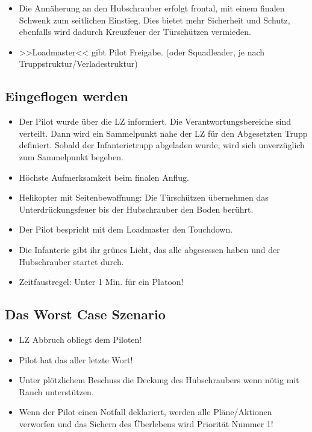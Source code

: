 \begin{itemize}
		\item Die Annäherung an den Hubschrauber erfolgt frontal, mit einem finalen Schwenk zum seitlichen Einstieg. Dies bietet mehr Sicherheit und Schutz, ebenfalls wird dadurch Kreuzfeuer der Türschützen vermieden.

		\item >>Loadmaster<< gibt Pilot Freigabe. (oder Squadleader, je nach Truppstruktur/Verladestruktur)
	\end{itemize}

\subsection{Eingeflogen werden}
	\begin{itemize} 
		\item Der Pilot wurde über die \ac{LZ} informiert. Die Verantwortungsbereiche sind verteilt. Dann wird ein Sammelpunkt nahe der \ac{LZ} für den Abgesetzten Trupp definiert. Sobald der Infanterietrupp abgeladen wurde, wird sich unverzüglich zum Sammelpunkt begeben.

		\item Höchste Aufmerksamkeit beim finalen Anflug.

		\item Helikopter mit Seitenbewaffnung: Die Türschützen übernehmen das Unterdrückungsfeuer bis der Hubschrauber den Boden berührt.

		\item Der Pilot bespricht mit dem Loadmaster den Touchdown.

		\item Die Infanterie gibt ihr grünes Licht, das alle abgesessen haben und der Hubschrauber startet durch.

		\item Zeitfaustregel: Unter 1 Min. für ein Platoon!
	\end{itemize}

\subsection{Das Worst Case Szenario}
	\begin{itemize}
		\item \ac{LZ} Abbruch obliegt dem Piloten!
		\item Pilot hat das aller letzte Wort!
		\item Unter plötzlichem Beschuss die Deckung des Hubschraubers wenn nötig mit Rauch unterstützen.
		\item Wenn der Pilot einen Notfall deklariert, werden alle Pläne/Aktionen verworfen und das Sichern des Überlebens wird Priorität Nummer 1!
	\end{itemize}

